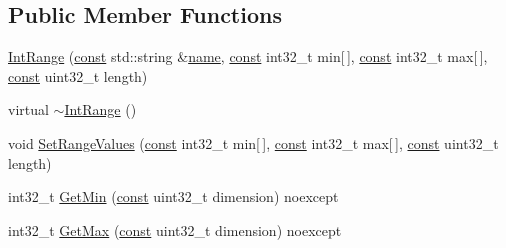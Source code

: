 \subsection*{Public Member Functions}
\begin{DoxyCompactItemize}
\item 
\mbox{\hyperlink{classlucene_1_1core_1_1document_1_1IntRange_a9572f1e81eb49c78f88db1337d0500c7}{Int\+Range}} (\mbox{\hyperlink{ZlibCrc32_8h_a2c212835823e3c54a8ab6d95c652660e}{const}} std\+::string \&\mbox{\hyperlink{classlucene_1_1core_1_1document_1_1Field_a52f673f3b3abb14b180f5159f4726537}{name}}, \mbox{\hyperlink{ZlibCrc32_8h_a2c212835823e3c54a8ab6d95c652660e}{const}} int32\+\_\+t min\mbox{[}$\,$\mbox{]}, \mbox{\hyperlink{ZlibCrc32_8h_a2c212835823e3c54a8ab6d95c652660e}{const}} int32\+\_\+t max\mbox{[}$\,$\mbox{]}, \mbox{\hyperlink{ZlibCrc32_8h_a2c212835823e3c54a8ab6d95c652660e}{const}} uint32\+\_\+t length)
\item 
virtual \mbox{\hyperlink{classlucene_1_1core_1_1document_1_1IntRange_a4e18e6a37effdedc53bb88b4c56e7e71}{$\sim$\+Int\+Range}} ()
\item 
void \mbox{\hyperlink{classlucene_1_1core_1_1document_1_1IntRange_a0516e1b5b62b2e0c6b3104be7dd3abaa}{Set\+Range\+Values}} (\mbox{\hyperlink{ZlibCrc32_8h_a2c212835823e3c54a8ab6d95c652660e}{const}} int32\+\_\+t min\mbox{[}$\,$\mbox{]}, \mbox{\hyperlink{ZlibCrc32_8h_a2c212835823e3c54a8ab6d95c652660e}{const}} int32\+\_\+t max\mbox{[}$\,$\mbox{]}, \mbox{\hyperlink{ZlibCrc32_8h_a2c212835823e3c54a8ab6d95c652660e}{const}} uint32\+\_\+t length)
\item 
int32\+\_\+t \mbox{\hyperlink{classlucene_1_1core_1_1document_1_1IntRange_a84ffeccb57aa7c9d7f9786e9e89ad8c8}{Get\+Min}} (\mbox{\hyperlink{ZlibCrc32_8h_a2c212835823e3c54a8ab6d95c652660e}{const}} uint32\+\_\+t dimension) noexcept
\item 
int32\+\_\+t \mbox{\hyperlink{classlucene_1_1core_1_1document_1_1IntRange_a317cfd53b44a625e56836cf508c18257}{Get\+Max}} (\mbox{\hyperlink{ZlibCrc32_8h_a2c212835823e3c54a8ab6d95c652660e}{const}} uint32\+\_\+t dimension) noexcept
\end{DoxyCompactItemize}
